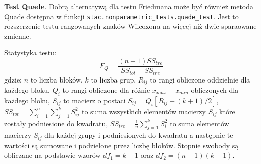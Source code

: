 \documentclass[polish,]{book}
\begin{document}
\textbf{Test Quade}. Dobrą alternatywą dla testu Friedmana może być również metoda Quade dostępna w funkcji \href{http://tec.citius.usc.es/stac/doc/stac.nonparametric_tests.quade_test.html\#stac.nonparametric_tests.quade_test}{\texttt{stac.nonparametric\_tests.quade\_test}}. Jest to rozszerzenie testu rangowanych znaków Wilcoxona na więcej niż dwie sparaowane zmienne.

Statystyka testu:
\begin{equation}
F_Q=\frac{(n-1)SS_{tre}}{SS_{tot}-SS_{tre}}
\label{eq:dep09}
\end{equation}
gdzie: \(n\) to liczba bloków, \(k\) to liczba grup, \(R_{ij}\) to rangi obliczone oddzielnie dla każdego bloku, \(Q_i\) to rangi obliczone dla różnic \(x_{max}-x_{min}\) obliczonych dla każdego bloku, \(S_{ij}\) to macierz o postaci \(S_{ij}=Q_i\left[R_{ij}-(k+1)/2\right]\), \(SS_{tot}=\sum_{i=1}^{n}\sum_{j=1}^{k}S_{ij}^2\) to suma wszystkich elementów macierzy \(S_{ij}\) które zostały podniesione do kwadratu, \(SS_{tre}=\frac{1}{n}\sum_{j=1}^{k}S_i^2\) to suma
elementów macierzy \(S_{ij}\) dla każdej grupy i podniesionych do kwadratu a następnie te wartości są sumowane i podzielone przez liczbę bloków. Stopnie swobody są obliczane na podstawie wzorów \(df_1=k-1\) oraz \(df_2=(n-1)(k-1)\).
\end{document}
